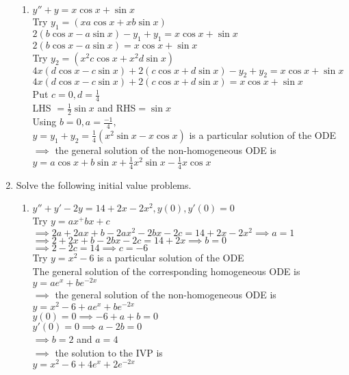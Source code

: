 \documentclass[a4paper]{article}
\begin{document}
\begin{enumerate}
\begin{enumerate}
		\item $y''+y=x\cos x + \sin x$\\
		Try $y_1=(xa\cos x +xb\sin x)$\\
		$2(b\cos x- a \sin x) - y_1 +y_1=x\cos x + \sin x$\\
		$2(b\cos x- a \sin x) =x\cos x + \sin x$\\
		Try $y_2=(x^2c\cos x +x^2d\sin x)$\\
		$4x(d\cos x- c \sin x) + 2(c\cos x+ d \sin x) - y_2 +y_2=x\cos x + \sin x$\\
		$4x(d\cos x- c \sin x) + 2(c\cos x+ d \sin x)=x\cos x + \sin x$\\
		Put $c=0, d=\frac{1}{4}$\\
		LHS $= \frac{1}{2} \sin x$ and RHS$ = \sin x$\\
		Using $b=0, a=\frac{-1}{4},$\\$ y=y_1+y_2=\frac{1}{4}(x^2\sin x-x\cos x) $ is a particular solution of the ODE\\
		$\implies$ the general solution of the non-homogeneous ODE is \\
		$y=a\cos x +b\sin x + \frac{1}{4}x^2\sin x-\frac{1}{4}x\cos x$
	\end{enumerate}
	
	\item Solve the following initial value problems.
	\begin{enumerate}
		\item $y''+y'-2y=14+2x-2x^2, y(0),y'(0)=0$\\
		Try $y=ax^ + bx +c$\\
		$\implies 2a + 2ax+b-2ax^2-2bx-2c=14+2x-2x^2 \implies a=1$\\
		$\implies 2 + 2x+b-2bx-2c=14+2x \implies b=0$\\		
		$\implies 2 -2c=14 \implies c=-6$\\
		Try $y=x^2 -6$ is a particular solution of the ODE\\
		The general solution of the corresponding homogeneous ODE is $y=ae^x+be^{-2x}$\\
		$\implies$ the general solution of the non-homogeneous ODE is \\
		$y=x^2 -6+ae^x+be^{-2x}$\\
		$y(0)=0 \implies -6+a+b=0$\\
		$y'(0)=0 \implies a-2b=0$\\
		$\implies b=2$ and $a=4$\\
		$\implies$ the solution to the IVP is \\
		$y=x^2 -6+4e^x+2e^{-2x}$
		

\end{enumerate}
\end{enumerate}
\end{document}
